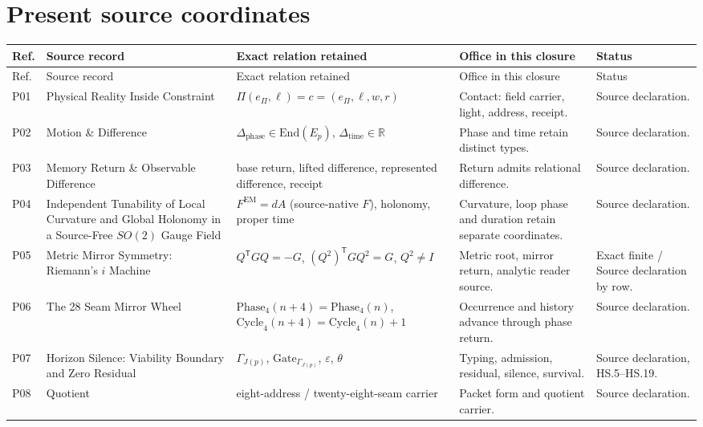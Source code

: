 \documentclass[11pt,a4paper]{article}
\newcommand{\RR}{\mathbb{R}}\newcommand{\QQ}{\mathbb{Q}}\newcommand{\ZZ}{\mathbb{Z}}
\newcommand{\tp}{^{\mathsf T}}
\newcommand{\FEM}{F^{\mathrm{EM}}}
\theoremstyle{plain}
\theoremstyle{definition}
\theoremstyle{remark}
\begin{document}
\section{Present source coordinates}\label{app:B}
{\footnotesize\setlength{\tabcolsep}{3pt}
\begin{longtable}{@{}>{\raggedright\arraybackslash}p{0.8cm}>{\raggedright\arraybackslash}p{4.4cm}>{\raggedright\arraybackslash}p{4.4cm}>{\raggedright\arraybackslash}p{3.1cm}>{\raggedright\arraybackslash}p{2.1cm}@{}}
\toprule
Ref. & Source record & Exact relation retained & Office in this closure & Status\\\midrule\endfirsthead
\toprule
Ref. & Source record & Exact relation retained & Office in this closure & Status\\\midrule\endhead
\bottomrule\endfoot
P01 & Physical Reality Inside Constraint & $\Pi(e_\Pi,\ell)=c=(e_\Pi,\ell,w,r)$ & Contact: field carrier, light, address, receipt. & Source declaration.\\
P02 & Motion \& Difference & $\Delta_{\mathrm{phase}}\in\mathrm{End}(E_p)$, $\Delta_{\mathrm{time}}\in\RR$ & Phase and time retain distinct types. & Source declaration.\\
P03 & Memory Return \& Observable Difference & base return, lifted difference, represented difference, receipt & Return admits relational difference. & Source declaration.\\
P04 & Independent Tunability of Local Curvature and Global Holonomy in a Source-Free $SO(2)$ Gauge Field & $\FEM=dA$ (source-native $F$), holonomy, proper time & Curvature, loop phase and duration retain separate coordinates. & Source declaration.\\
P05 & Metric Mirror Symmetry: Riemann's $i$ Machine & $Q\tp GQ=-G$, $(Q^2)\tp GQ^2=G$, $Q^2\ne I$ & Metric root, mirror return, analytic reader source. & Exact finite / Source declaration by row.\\
P06 & The 28 Seam Mirror Wheel & $\mathrm{Phase}_4(n+4)=\mathrm{Phase}_4(n)$, $\mathrm{Cycle}_4(n+4)=\mathrm{Cycle}_4(n)+1$ & Occurrence and history advance through phase return. & Source declaration.\\
P07 & Horizon Silence: Viability Boundary and Zero Residual & $\Gamma_{J(p)}$, $\mathrm{Gate}_{\Gamma_{J(p)}}$, $\varepsilon$, $\theta$ & Typing, admission, residual, silence, survival. & Source declaration, HS.5--HS.19.\\
P08 & Quotient & eight-address / twenty-eight-seam carrier & Packet form and quotient carrier. & Source declaration.\\

\end{longtable}}
\end{document}
